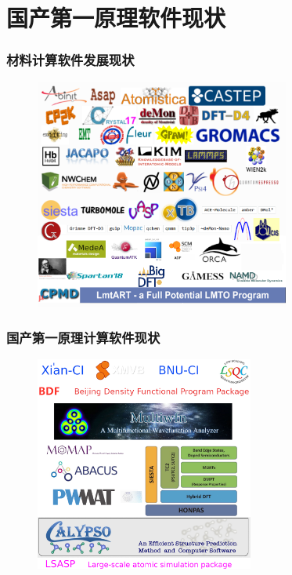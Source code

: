 \section{国产第一原理软件现状}
\frame
{
	\frametitle{材料计算软件发展现状}
\begin{figure}[h!]
\vspace*{-0.16in}
\centering
\includegraphics[width=3.30in]{Figures/Softwares_logo.png}
\label{Softwares}
\end{figure}
}

\frame
{
	\frametitle{国产第一原理计算软件现状}
\begin{figure}[h!]
\vspace*{-0.19in}
\centering
\includegraphics[width=2.83in]{Figures/Softwares_China-logo.png}
\label{Software-China}
\end{figure}
	\fontsize{6.2pt}{5.2pt}\selectfont{\textcolor{red}{中国学科发展战略\,$\cdot$\,理论与计算化学,~~国家自然科学基金委员会,~中国科学院,~~北京:~科学出版社,~~2016}}
}

